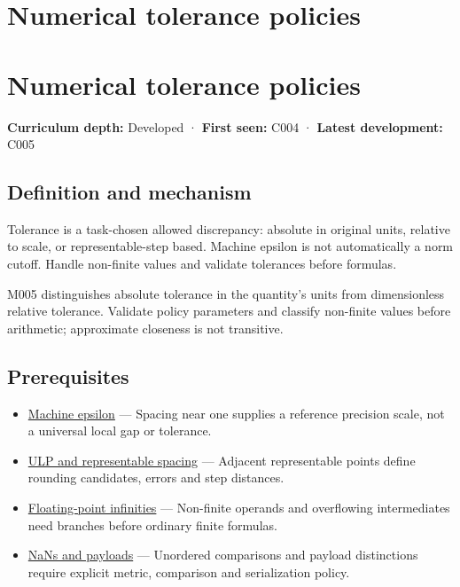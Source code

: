 \hypertarget{appendix-0ec599f8ba27}{}
\section*{Numerical tolerance policies}
\section{Numerical tolerance policies}\label{appendix-0ec599f8ba27-numerical-tolerance-policies}

\textbf{Curriculum depth:} Developed · \textbf{First seen:} C004 · \textbf{Latest development:} C005

\subsection{Definition and mechanism}\label{appendix-0ec599f8ba27-definition-and-mechanism}

Tolerance is a task-chosen allowed discrepancy: absolute in original units, relative to scale, or representable-step based. Machine epsilon is not automatically a norm cutoff. Handle non-finite values and validate tolerances before formulas.

M005 distinguishes absolute tolerance in the quantity's units from dimensionless relative tolerance. Validate policy parameters and classify non-finite values before arithmetic; approximate closeness is not transitive.

\subsection{Prerequisites}\label{appendix-0ec599f8ba27-prerequisites}

\begin{itemize}
\tightlist
\item
  \hyperref[appendix-390ea641da54]{Machine epsilon} --- Spacing near one supplies a reference precision scale, not a universal local gap or tolerance.
\item
  \hyperref[appendix-14bab4cab9d4]{ULP and representable spacing} --- Adjacent representable points define rounding candidates, errors and step distances.
\item
  \hyperref[appendix-eb336149c00a]{Floating-point infinities} --- Non-finite operands and overflowing intermediates need branches before ordinary finite formulas.
\item
  \hyperref[appendix-d6607cc4c235]{NaNs and payloads} --- Unordered comparisons and payload distinctions require explicit metric, comparison and serialization policy.
\end{itemize}

